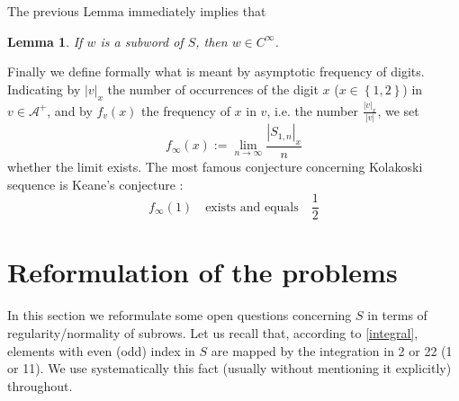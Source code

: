 \documentclass[10pt,a4paper]{article}
\newtheorem{lemma}{Lemma}
\begin{document}
 The previous Lemma immediately implies that
\begin{lemma}
If $w$ is a subword of $S$, then $w\in C^{\infty}$.
\label{Cinfty}
\end{lemma}

Finally we define formally what is meant by asymptotic frequency of digits. 
Indicating by $|v|_x$ the number of occurrences of the digit $x$ ($x\in\left\lbrace 1,2 \right\rbrace$) in $v\in \mathcal{A^+}$, and by $f_v(x)$ the frequency of $x$ in $v$, i.e. the number $\frac{|v|_x}{|v|}$, we set $$f_{\infty}(x):=\lim_{n\rightarrow \infty} \frac{|S_{1,n}|_{x}}{n}$$ whether the limit exists. The most famous conjecture concerning Kolakoski sequence is Keane's conjecture  \cite{keane1991ergodic}: $$f_{\infty}(1)\quad \text{exists and equals}\quad \frac{1}{2}$$

\section{Reformulation of the problems}
\label{refo}

In this section we reformulate some open questions concerning $S$ in terms of regularity/normality of subrows. Let us recall that, according to \eqref{integral}, elements with even (odd) index in $S$ are mapped by the integration in 2 or 22 (1 or 11). We use systematically this fact (usually without mentioning it explicitly) throughout. 
\end{document}
